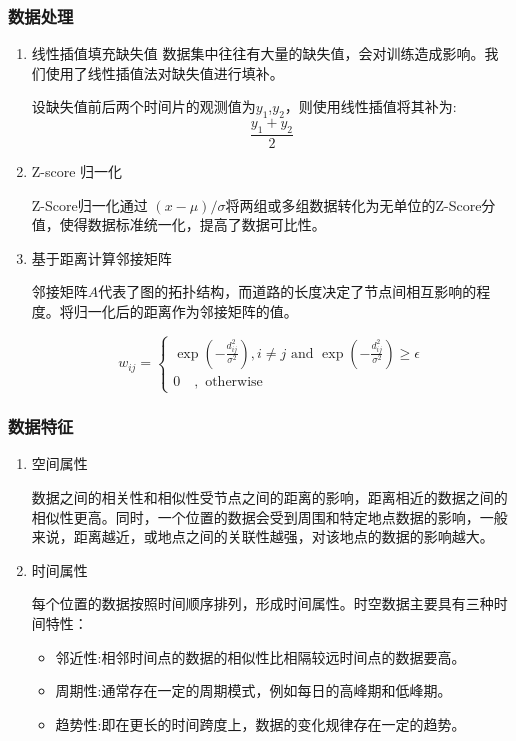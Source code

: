 \documentclass[UTF8]{ctexart}
\numberwithin{equation}{section}
\begin{document}
\subsubsection{数据处理}
\begin{enumerate}
	\item 线性插值填充缺失值
	数据集中往往有大量的缺失值，会对训练造成影响。我们使用了线性插值法对缺失值进行填补。
	
	设缺失值前后两个时间片的观测值为$y_1$,$y_2$，则使用线性插值将其补为:
	$$
	\frac{y_1+y_2}{2}
	$$
	\item Z-score 归一化
	
	Z-Score归一化通过 $(x- \mu)/\sigma$将两组或多组数据转化为无单位的Z-Score分值，使得数据标准统一化，提高了数据可比性。
	
	\item 基于距离计算邻接矩阵
	
	邻接矩阵$A$代表了图的拓扑结构，而道路的长度决定了节点间相互影响的程度。将归一化后的距离作为邻接矩阵的值。
	
	$$
	w_{i j}=\left\{\begin{array}{l}
		\exp \left(-\frac{d_{i j}^{2}}{\sigma^{2}}\right), i \neq j \text { and } \exp \left(-\frac{d_{i j}^{2}}{\sigma^{2}}\right) \geq \epsilon \\
		0 \quad, \text { otherwise }
	\end{array}\right.$$
	
\end{enumerate}

\subsubsection{数据特征}
\begin{enumerate}
	\item 空间属性
	
	数据之间的相关性和相似性受节点之间的距离的影响，距离相近的数据之间的相似性更高。同时，一个位置的数据会受到周围和特定地点数据的影响，一般来说，距离越近，或地点之间的关联性越强，对该地点的数据的影响越大。
	
	\item 时间属性
	
	每个位置的数据按照时间顺序排列，形成时间属性。时空数据主要具有三种时间特性：
	\begin{itemize}
		\item 邻近性:相邻时间点的数据的相似性比相隔较远时间点的数据要高。
		\item 周期性:通常存在一定的周期模式，例如每日的高峰期和低峰期。
		\item 趋势性:即在更长的时间跨度上，数据的变化规律存在一定的趋势。
	\end{itemize}
\end{enumerate}
\end{document}
